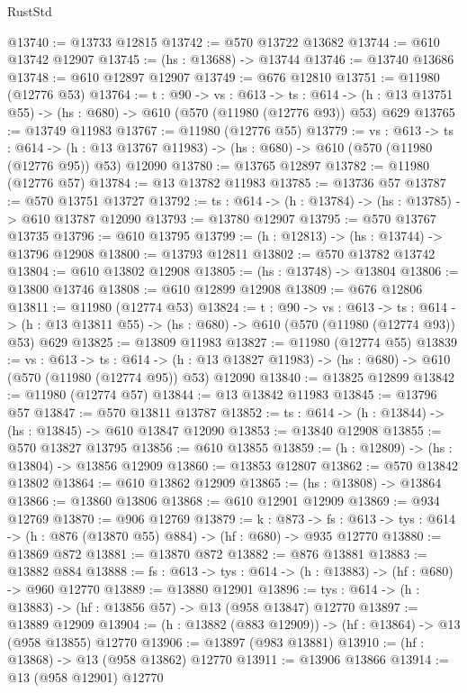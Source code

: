 \begin{lexlean}{RustStd}
\begin{coremodule}
@13740 := @13733 @12815
@13742 := @570 @13722 @13682
@13744 := @610 @13742 @12907
@13745 := (hs : @13688) -> @13744
@13746 := @13740 @13686
@13748 := @610 @12897 @12907
@13749 := @676 @12810
@13751 := @11980 (@12776 @53)
@13764 := {t : @90} ->
  {vs : @613} ->
  {ts : @614} -> (h : @13 @13751 @55) -> (hs : @680) -> @610 (@570 (@11980 (@12776 @93)) @53) @629
@13765 := @13749 @11983
@13767 := @11980 (@12776 @55)
@13779 := {vs : @613} ->
  {ts : @614} ->
  (h : @13 @13767 @11983) -> (hs : @680) -> @610 (@570 (@11980 (@12776 @95)) @53) @12090
@13780 := @13765 @12897
@13782 := @11980 (@12776 @57)
@13784 := @13 @13782 @11983
@13785 := @13736 @57
@13787 := @570 @13751 @13727
@13792 := {ts : @614} -> (h : @13784) -> (hs : @13785) -> @610 @13787 @12090
@13793 := @13780 @12907
@13795 := @570 @13767 @13735
@13796 := @610 @13795
@13799 := (h : @12813) -> (hs : @13744) -> @13796 @12908
@13800 := @13793 @12811
@13802 := @570 @13782 @13742
@13804 := @610 @13802 @12908
@13805 := (hs : @13748) -> @13804
@13806 := @13800 @13746
@13808 := @610 @12899 @12908
@13809 := @676 @12806
@13811 := @11980 (@12774 @53)
@13824 := {t : @90} ->
  {vs : @613} ->
  {ts : @614} -> (h : @13 @13811 @55) -> (hs : @680) -> @610 (@570 (@11980 (@12774 @93)) @53) @629
@13825 := @13809 @11983
@13827 := @11980 (@12774 @55)
@13839 := {vs : @613} ->
  {ts : @614} ->
  (h : @13 @13827 @11983) -> (hs : @680) -> @610 (@570 (@11980 (@12774 @95)) @53) @12090
@13840 := @13825 @12899
@13842 := @11980 (@12774 @57)
@13844 := @13 @13842 @11983
@13845 := @13796 @57
@13847 := @570 @13811 @13787
@13852 := {ts : @614} -> (h : @13844) -> (hs : @13845) -> @610 @13847 @12090
@13853 := @13840 @12908
@13855 := @570 @13827 @13795
@13856 := @610 @13855
@13859 := (h : @12809) -> (hs : @13804) -> @13856 @12909
@13860 := @13853 @12807
@13862 := @570 @13842 @13802
@13864 := @610 @13862 @12909
@13865 := (hs : @13808) -> @13864
@13866 := @13860 @13806
@13868 := @610 @12901 @12909
@13869 := @934 @12769
@13870 := @906 @12769
@13879 := {k : @873} ->
  {fs : @613} -> {tys : @614} -> (h : @876 (@13870 @55) @884) -> (hf : @680) -> @935 @12770
@13880 := @13869 @872
@13881 := @13870 @872
@13882 := @876 @13881
@13883 := @13882 @884
@13888 := {fs : @613} -> {tys : @614} -> (h : @13883) -> (hf : @680) -> @960 @12770
@13889 := @13880 @12901
@13896 := {tys : @614} -> (h : @13883) -> (hf : @13856 @57) -> @13 (@958 @13847) @12770
@13897 := @13889 @12909
@13904 := (h : @13882 (@883 @12909)) -> (hf : @13864) -> @13 (@958 @13855) @12770
@13906 := @13897 (@983 @13881)
@13910 := (hf : @13868) -> @13 (@958 @13862) @12770
@13911 := @13906 @13866
@13914 := @13 (@958 @12901) @12770

\end{coremodule}
\end{lexlean}
